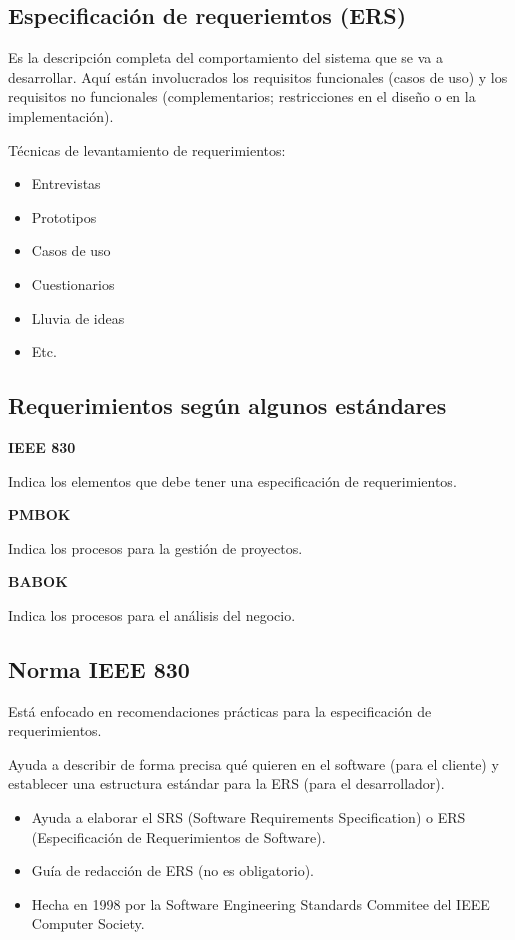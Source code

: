 \documentclass{article}
\begin{document}
\subsection{Especificación de requeriemtos (ERS)}

Es la descripción completa del comportamiento del sistema que se va a desarrollar.
Aquí están involucrados los requisitos funcionales (casos de uso) y los
requisitos no funcionales (complementarios; restricciones en el diseño o en la
implementación).

\vspace{1em}
Técnicas de levantamiento de requerimientos:
\begin{itemize}
	\item
		Entrevistas
	\item
		Prototipos
	\item
		Casos de uso
	\item
		Cuestionarios
	\item
		Lluvia de ideas
	\item
		Etc.
\end{itemize}

\subsection{Requerimientos según algunos estándares}

\textbf{IEEE 830}

Indica los elementos que debe tener una especificación de requerimientos.

\vspace{1em}
\textbf{PMBOK}

Indica los procesos para la gestión de proyectos.

\vspace{1em}
\textbf{BABOK}

Indica los procesos para el análisis del negocio.

\subsection{Norma IEEE 830}

Está enfocado en recomendaciones prácticas para la especificación de requerimientos.

Ayuda a describir de forma precisa qué quieren en el software (para el cliente)
y establecer una estructura estándar para la ERS (para el desarrollador).


\begin{itemize}
	\item
		Ayuda a elaborar el SRS (Software Requirements Specification) o
		ERS (Especificación de Requerimientos de Software).
	\item
		Guía de redacción de ERS (no es obligatorio).
	\item
		Hecha en 1998 por la Software Engineering Standards Commitee del
		IEEE Computer Society.
\end{itemize}
\end{document}
